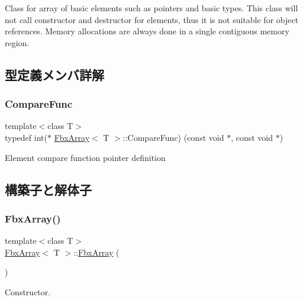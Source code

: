Class for array of basic elements such as pointers and basic types. This class will not call constructor and destructor for elements, thus it is not suitable for object references. Memory allocations are always done in a single contiguous memory region. 

\subsection{型定義メンバ詳解}
\mbox{\label{class_fbx_array_a3f251a5b7314e26facb298dcf3856557}} 
\subsubsection{\texorpdfstring{Compare\+Func}{CompareFunc}}
{\footnotesize\ttfamily template$<$class T$>$ \\
typedef int($\ast$ \hyperlink{class_fbx_array}{Fbx\+Array}$<$ T $>$\+::Compare\+Func) (const void $\ast$, const void $\ast$)}



Element compare function pointer definition 



\subsection{構築子と解体子}
\mbox{\label{class_fbx_array_a423ab605db86db1663db8b35043f6f9d}} 
\subsubsection{\texorpdfstring{Fbx\+Array()}{FbxArray()}\hspace{0.1cm}{\footnotesize\ttfamily [1/3]}}
{\footnotesize\ttfamily template$<$class T$>$ \\
\hyperlink{class_fbx_array}{Fbx\+Array}$<$ T $>$\+::\hyperlink{class_fbx_array}{Fbx\+Array} (\begin{DoxyParamCaption}{ }\end{DoxyParamCaption})}



Constructor. 

\mbox{\label{class_fbx_array_ac3a4674fa57256ad8be76d3d815cd5be}} 
